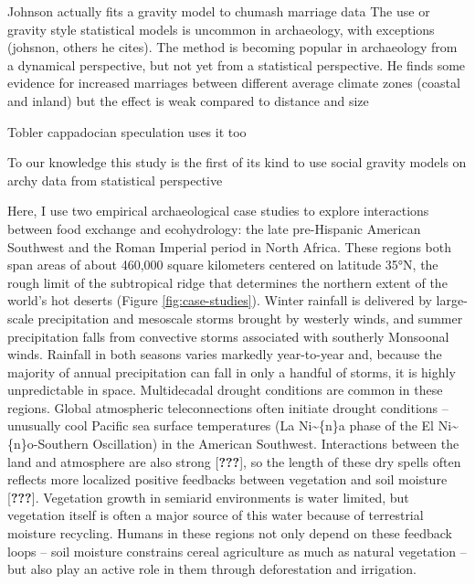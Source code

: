 \documentclass[10pt,letterpaper]{article}
\begin{document}
Johnson actually fits a gravity model to chumash marriage data The use
or gravity style statistical models is uncommon in archaeology, with
exceptions (johsnon, others he cites). The method is becoming popular in
archaeology from a dynamical perspective, but not yet from a statistical
perspective. He finds some evidence for increased marriages between
different average climate zones (coastal and inland) but the effect is
weak compared to distance and size

Tobler cappadocian speculation uses it too

To our knowledge this study is the first of its kind to use social
gravity models on archy data from statistical perspective

Here, I use two empirical archaeological case studies to explore
interactions between food exchange and ecohydrology: the late
pre-Hispanic American Southwest and the Roman Imperial period in North
Africa. These regions both span areas of about 460,000 square kilometers
centered on latitude 35°N, the rough limit of the subtropical ridge that
determines the northern extent of the world's hot deserts (Figure
\ref{fig:case-studies}). Winter rainfall is delivered by large-scale
precipitation and mesoscale storms brought by westerly winds, and summer
precipitation falls from convective storms associated with southerly
Monsoonal winds. Rainfall in both seasons varies markedly year-to-year
and, because the majority of annual precipitation can fall in only a
handful of storms, it is highly unpredictable in space. Multidecadal
drought conditions are common in these regions. Global atmospheric
teleconnections often initiate drought conditions -- unusually cool
Pacific sea surface temperatures (La Ni\textasciitilde{}\{n\}a phase of
the El Ni\textasciitilde{}\{n\}o-Southern Oscillation) in the American
Southwest. Interactions between the land and atmosphere are also strong
{[}{\textbf{???}}{]}, so the length of these dry spells often reflects
more localized positive feedbacks between vegetation and soil moisture
{[}{\textbf{???}}{]}. Vegetation growth in semiarid environments is
water limited, but vegetation itself is often a major source of this
water because of terrestrial moisture recycling. Humans in these regions
not only depend on these feedback loops -- soil moisture constrains
cereal agriculture as much as natural vegetation -- but also play an
active role in them through deforestation and irrigation.
\end{document}
